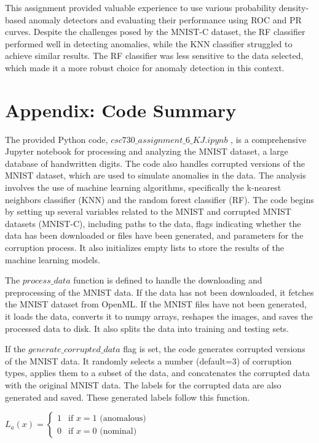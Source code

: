 This assignment provided valuable experience to use various probability density-based anomaly detectors and evaluating their performance using ROC and PR curves.
Despite the challenges posed by the MNIST-C dataset, the RF classifier performed well in detecting anomalies, while the KNN classifier struggled to achieve similar results. 
The RF classifier was less sensitive to the data selected, which made it a more robust choice for anomaly detection in this context.   


\section{Appendix: Code Summary}





The provided Python code, $csc730\_assignment\_6\_KJ.ipynb$ ,  is a comprehensive Jupyter notebook for processing and analyzing the MNIST dataset, a large database of handwritten digits. The code also handles corrupted versions of the MNIST dataset, which are used to simulate anomalies in the data. 
The analysis involves the use of machine learning algorithms, specifically the k-nearest neighbors classifier (KNN) and the random forest classifier (RF).
The code begins by setting up several variables related to the MNIST and corrupted MNIST datasets (MNIST-C), including paths to the data, flags indicating whether the data has been downloaded or files have been generated, and parameters for the corruption process. 
It also initializes empty lists to store the results of the machine learning models.\par

The $process\_data$ function is defined to handle the downloading and preprocessing of the MNIST data. 
If the data has not been downloaded, it fetches the MNIST dataset from OpenML. 
If the MNIST files have not been generated, it loads the data, converts it to numpy arrays, reshapes the images, and saves the processed data to disk. 
It also splits the data into training and testing sets.\par

If the $generate\_corrupted\_data$ flag is set, the code generates corrupted versions of the MNIST data.
It randomly selects a number (default=3) of corruption types, applies them to a subset of the data, and concatenates the corrupted data with the original MNIST data. 
The labels for the corrupted data are also generated and saved. These generated labels follow this function.\par
$L_a(x) = 
\begin{cases} 
1 & \text{if } x = 1 \text{ (anomalous)} \\
0 & \text{if } x = 0 \text{ (nominal)}
\end{cases}$ \par

